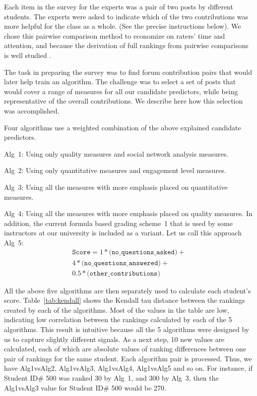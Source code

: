 Each item in the survey for the experts was a pair of two posts by
different students. The experts were asked to indicate which of the
two contributions was more helpful for the class as a whole. (See the
precise instructions below). We chose this pairwise comparison method
to economize on raters' time and attention, and because the derivation
of full rankings from pairwise comparisons is well studied
\cite{heck2018,jami2011}.

The task in preparing the survey was to find forum contribution pairs
that would later help train an algorithm. The challenge was to select
a set of posts that would cover a range of measures for all our
candidate predictors, while being representative of the overall
contributions.  We describe here how this selection was accomplished.

Four algorithms use a weighted combination of the
above explained candidate predictors.

\squishlist
\item Alg~1: Using only quality measures and social network analysis measures.
\item Alg~2: Using only quantitative measures and engagement level measures.
\item Alg~3: Using all the measures with more emphasis placed on quantitative measures.
\item Alg~4: Using all the measures with more emphasis placed on quality measures.
\squishend
In addition, the current formula based grading scheme~1 that is used
by some instructors at our university is included as a variant. Let us call this approach Alg~5:
\begin{equation}
\begin{split}
\texttt{Score} = 1 * \texttt{(no\_questions\_asked)} + 
\\ 4 * \texttt{(no\_questions\_answered)} + \\
0.5* \texttt{(other\_contributions)}
\end{split}
\end{equation}

All the above five algorithms are then separately used to
calculate each student's score. 
Table~\ref{tab:kendall} shows the Kendall tau distance between the
rankings created by each of the algorithms. Most of the values in the
table are low, indicating low correlation between the rankings
calculated by each of the 5 algorithms. This result is intuitive because all the 5 algorithms were designed by us to capture slightly different signals.
As a next step, 10 new values are calculated,
each of which are absolute values of ranking differences between one
pair of rankings for the same student. Each algorithm pair is
processed. Thus, we have Alg1vsAlg2, Alg1vsAlg3, Alg1vsAlg4,
Alg1vsAlg5 and so on. For instance, if Student ID\# 500 was ranked 30
by Alg~1, and 300 by Alg~3, then the Alg1vsAlg3 value for Student ID\#
500 would be 270.

